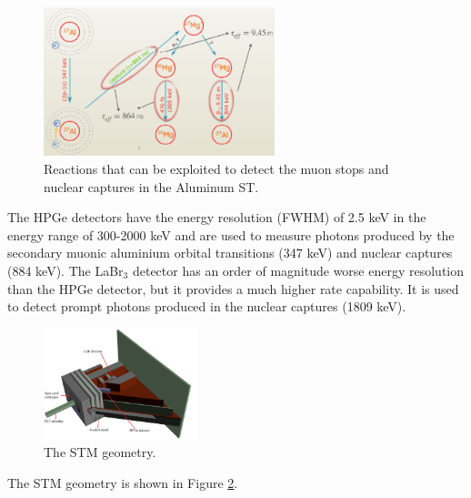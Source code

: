 \begin{figure}[!h]
    \centering
    \includegraphics[width =0.6\textwidth]{figures/png/Screenshot_20240706_094517.png}
    \caption[The muon stops 
    and nuclear captures detection in Al ST.]{Reactions that can be exploited to detect the muon stops 
    and nuclear captures in the Aluminum ST.}
    \label{fig:stmprocess}
    \end{figure}



The HPGe detectors have the 
    energy resolution (FWHM) of 2.5 keV in the energy range of 300-2000 keV and are used 
    to measure photons produced by the secondary muonic aluminium orbital transitions 
    (347 keV) and nuclear captures (884 keV). The LaBr$_3$ detector has an order of 
    magnitude worse energy resolution than the HPGe detector, but it provides a much 
    higher rate capability. It is used to detect prompt photons produced
    in the nuclear captures (1809 keV).  
    \begin{figure}[!h]
        \centering
        \includegraphics[width =0.4\textwidth]{figures/png/Setup.png}
        \caption[The Stopping Target Monitor geometry.]{The STM geometry.}
        \label{fig:stmfigure}
        \end{figure}
The STM geometry is shown in Figure \ref{fig:stmfigure}.

